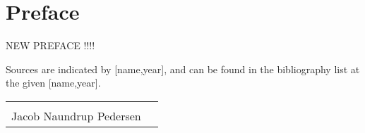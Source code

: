 \chapter*{Preface}
NEW PREFACE !!!!


Sources are indicated by [name,year], and can be found in the bibliography list at the given
[name,year].
\vfill

\begin{table}[H]
	\centering
		\begin{tabular}{c c }
			\underline{\phantom{mmmmmmmmmmmmmmmmmmm}}       \\
			Jacob Naundrup Pedersen \\
		\end{tabular}
		
\end{table}

